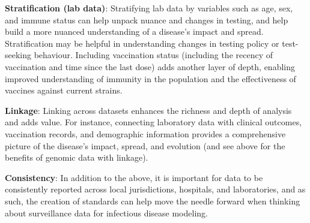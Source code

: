 {\bf Stratification (lab data)}: Stratifying lab data by variables such as age, sex, and immune status can help unpack nuance and changes in testing, and help build a more nuanced understanding of a disease's impact and spread. Stratification may be helpful in understanding changes in testing policy or test-seeking behaviour. Including vaccination status (including the recency of vaccination and time since the last dose) adds another layer of depth, enabling improved understanding of immunity in the population and the effectiveness of vaccines against current strains.

{\bf Linkage}: Linking across datasets enhances the richness and depth of analysis and adds value. For instance, connecting laboratory data with clinical outcomes, vaccination records, and demographic information provides a comprehensive picture of the disease's impact, spread, and evolution (and see above for the benefits of genomic data with linkage).  

{\bf Consistency}: In addition to the above, it is important for data to be consistently reported across local jurisdictions, hospitals, and laboratories, and as such, the creation of standards can help move the needle forward when thinking about surveillance data for infectious disease modeling.


